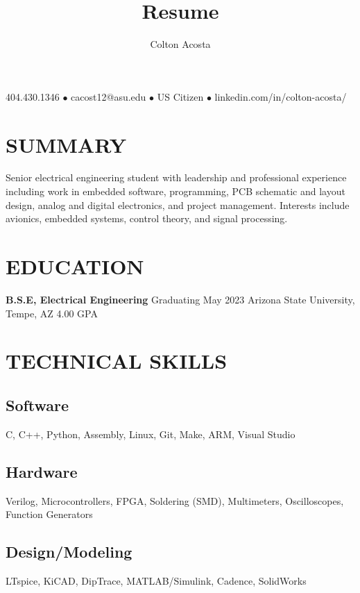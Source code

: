 \documentclass{article}
\makeatletter
\renewcommand{\maketitle}{
	\begin{center}
		{\huge\bfseries
			\theauthor}
			
		404.430.1346 $\bullet$ cacost12@asu.edu $\bullet$ US Citizen $\bullet$ linkedin.com/in/colton-acosta/
	\end{center}
}
\makeatother
\begin{document}
\title{Resume}
\author{Colton Acosta}
\maketitle
\section{SUMMARY}
Senior electrical engineering student with leadership and professional experience including work in embedded software, programming, PCB schematic and layout design, analog and digital electronics, and project management. Interests include avionics, embedded systems, control theory, and signal processing. 
\section{EDUCATION}
\textbf{B.S.E, Electrical Engineering}
\hfill 
Graduating May 2023
\linebreak
Arizona State University, Tempe, AZ 
\hfill
4.00 GPA

\section{TECHNICAL SKILLS}
\subsection{Software} 
C, C++, Python, Assembly, Linux, Git, Make, ARM, Visual Studio 
\subsection{Hardware}
Verilog, Microcontrollers, FPGA, Soldering (SMD), Multimeters, Oscilloscopes, Function Generators 
\subsection{Design/Modeling}
LTspice, KiCAD, DipTrace, MATLAB/Simulink, Cadence, SolidWorks
\end{document}
